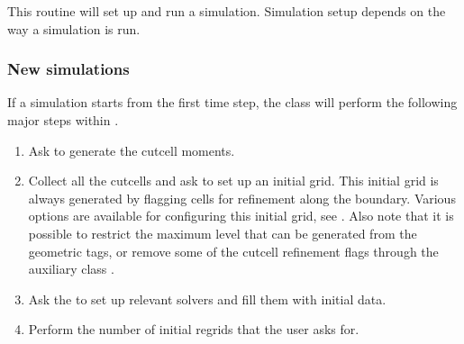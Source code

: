 \documentclass[letterpaper,10pt,english]{sphinxmanual}
\begin{document}
\begin{sphinxVerbatim}[commandchars=\\\{\},formatcom=\scriptsize]
   
\end{sphinxVerbatim}

\sphinxAtStartPar
This routine will set up and run a simulation.
Simulation setup depends on the way a simulation is run.


\subsubsection{New simulations}
\label{\detokenize{Source/Driver:new-simulations}}
\sphinxAtStartPar
If a simulation starts from the first time step, the  class will perform the following major steps within .
\begin{enumerate}
%
\item {} 
\sphinxAtStartPar
Ask  to generate the cut\sphinxhyphen{}cell moments.

\item {} 
\sphinxAtStartPar
Collect all the cut\sphinxhyphen{}cells and ask  to set up an initial grid.
This initial grid is always generated by flagging cells for refinement along the boundary.
Various options are available for configuring this initial grid, see {\hyperref[\detokenize{Source/SpatialDiscretization:chap-refinementphilosophy}]{}}.
Also note that it is possible to restrict the maximum level that can be generated from the geometric tags, or remove some of the cut\sphinxhyphen{}cell refinement flags through the auxiliary class .

\item {} 
\sphinxAtStartPar
Ask the  to set up relevant solvers and fill them with initial data.

\item {} 
\sphinxAtStartPar
Perform the number of initial regrids that the user asks for.

\end{enumerate}
\end{document}
